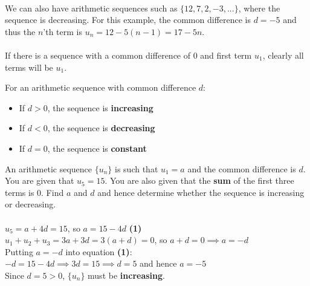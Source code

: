 \documentclass[12pt, a4paper, titlepage, twoside]{article}
\newcounter{excount}[subsection]
\begin{document}
	\paragraph{}
	We can also have arithmetic sequences such as $\{12, 7, 2, -3,...\}$, where the sequence is decreasing.
	For this example, the common difference is $d = -5$ and thus the $n$'th term is $u_n = 12 - 5(n-1) = 17 - 5n$.
	
	\paragraph{}
	If there is a sequence with a common difference of $0$ and first term $u_1$, clearly all terms will be $u_1$.\\
	
	\begin{kp}
		For an arithmetic sequence with common difference $d$:
		\begin{itemize}
			\item If $d>0$, the sequence is \textbf{increasing}
			\item If $d<0$, the sequence is \textbf{decreasing} 
			\item If $d=0$, the sequence is \textbf{constant} 
		\end{itemize}
	\end{kp}
	
	\hfill
	
	\begin{ex}
		An arithmetic sequence $\{u_n\}$ is such that $u_1 = a$ and the common difference is $d$. You are given that
		$u_5 = 15$. You are also given that the \textbf{sum} of the first three terms is $0$. Find $a$ and $d$ and hence determine
		whether the sequence is increasing or decreasing.\\
		
		\tcbline
		\hfill \\
		$u_5 = a + 4d = 15$, so $a = 15- 4d$ \hfill \textbf{(1)}\\
		$u_1 + u_2 + u_3 = 3a + 3d = 3(a+d) = 0$, so $a+d = 0 \implies a = -d$\\
		
		Putting $a=-d$ into equation \textbf{(1)}:\\
		$-d = 15-4d \implies 3d = 15 \implies d = 5$ and hence $a = -5$\\
		
		Since $d = 5 > 0$, $\{u_n\}$ must be \textbf{increasing}.
	\end{ex}
	
\end{document}
